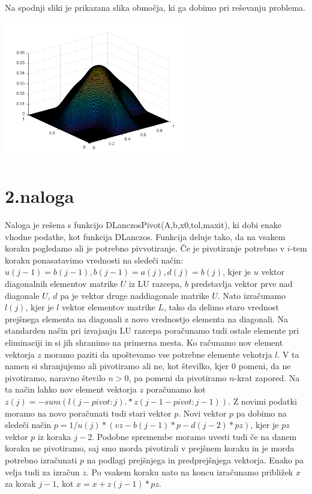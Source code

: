 \documentclass[11pt]{article} %
\begin{document}
Na spodnji sliki je prikazana slika območja, ki ga dobimo pri reševanju problema.

\includegraphics[width=0.6\textwidth]{slika1}

\section{2.naloga}

Naloga je rešena s funkcijo DLanczosPivot(A,b,x0,tol,maxit), ki dobi enake vhodne podatke, kot funkcija DLanczos. Funkcija deluje tako, da na vsakem koraku pogledamo ali je potrebno pivvotiranje. Če je pivotiranje potrebno v $i$-tem koraku ponasatavimo vrednosti  na sledeči način:
$u(j-1) = b(j-1), b(j-1) = a(j), d(j) = b(j)$, kjer je $u$ vektor diagonalnih elementov matrike $U$ iz LU razcepa, $b$ predstavlja vektor prve nad diagonale $U$, $d$ pa je vektor druge naddiagonale matrike $U$. Nato izračunamo $l(j)$, kjer je $l$ vektor elementov matrike $L$, tako da delimo staro vrednost prejšnega elementa na diagonali z novo vrednostjo elementa
na diagonali. Na standarden način pri izvajanju LU razcepa poračunamo tudi ostale elemente pri eliminaciji in si jih shranimo na primerna mesta. Ko računamo nov element vektorja $z$ moramo paziti da upoštevamo vse potrebne elemente vekotrja $l$. V ta namen si shranjujemo ali pivotiramo ali ne, kot številko, kjer $0$ pomeni, da ne pivotiramo, naravno število $n>0$, pa pomeni da pivotiramo $n$-krat zapored. Na ta način lahko nov element vektorja $z$ poračunamo kot  $z(j) = -sum(l(j-pivot:j).*z(j-1-pivot:j-1))$. Z novimi podatki moramo na novo poračunati tudi stari vektor $p$. Novi vektor $p$ pa dobimo na sledeči način $p = 1/u(j)*(vz - b(j-1)*p - d(j-2)*pz)$, kjer je $pz$ vektor $p$ iz koraka $j-2$. Podobne spremembe moramo uvesti tudi če na danem koraku ne pivotiramo, saj smo morda pivotirali v prejšnem koraku in je morda potrebno izračunati $p$ na podlagi prejšnjega in predprejšnjega vektorja. Enako pa velja tudi za izračun $z$. Po vsakem koraku nato na koncu izračunamo približek $x$ za korak $j-1$, kot $x = x + z(j-1)*pz$.
\end{document}
